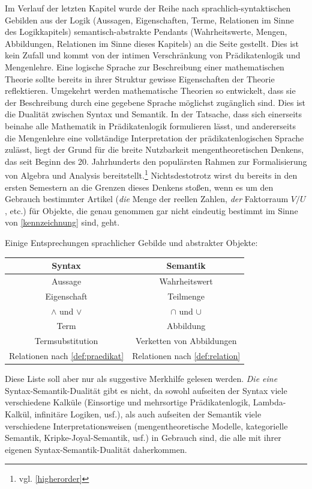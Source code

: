 \begin{bem} \label{syntaxvssemantik} 
    Im Verlauf der letzten Kapitel wurde der Reihe nach sprachlich-syntaktischen Gebilden aus der Logik (Aussagen, Eigenschaften, Terme, Relationen im Sinne des Logikkapitels) semantisch-abstrakte Pendants (Wahrheitswerte, Mengen, Abbildungen, Relationen im Sinne dieses Kapitels) an die Seite gestellt. Dies ist kein Zufall und kommt von der intimen Verschränkung von Prädikatenlogik und Mengenlehre. Eine logische Sprache zur Beschreibung einer mathematischen Theorie sollte bereits in ihrer Struktur gewisse Eigenschaften der Theorie reflektieren. Umgekehrt werden mathematische Theorien so entwickelt, dass sie der Beschreibung durch eine gegebene Sprache möglichst zugänglich sind. Dies ist die Dualität zwischen Syntax und Semantik. In der Tatsache, dass sich einerseits beinahe alle Mathematik in Prädikatenlogik formulieren lässt, und andererseits die Mengenlehre eine vollständige Interpretation der prädikatenlogischen Sprache zulässt, liegt der Grund für die breite Nutzbarkeit mengentheoretischen Denkens, das seit Beginn des 20. Jahrhunderts den populärsten Rahmen zur Formalisierung von Algebra und Analysis bereitstellt.\footnote{vgl. \cref{higherorder}} Nichtsdestotrotz wirst du bereits in den ersten Semestern an die Grenzen dieses Denkens stoßen, wenn es um den Gebrauch bestimmter Artikel (\emph{die} Menge der reellen Zahlen, \emph{der} Faktorraum $V/U$, etc.) für Objekte, die genau genommen gar nicht eindeutig bestimmt im Sinne von \cref{kennzeichnung} sind, geht.

    Einige Entsprechungen sprachlicher Gebilde und abstrakter Objekte:
    \begin{center}
    \begin{tabular}{cc}
        Syntax & Semantik \\
        \midrule
        Aussage & Wahrheitswert \\
        Eigenschaft & Teilmenge \\
        $\land$ und $\lor$ & $\cap$ und $\cup$ \\
        Term & Abbildung \\
        Termsubstitution & Verketten von Abbildungen \\
        Relationen nach \cref{def:praedikat} & Relationen nach \cref{def:relation} \\
    \end{tabular}
    \end{center}
    Diese Liste soll aber nur als suggestive Merkhilfe gelesen werden. \emph{Die eine} Syntax-Semantik-Dualität gibt es nicht, da sowohl aufseiten der Syntax viele verschiedene Kalküle (Einsortige und mehrsortige Prädikatenlogik, Lambda-Kalkül, infinitäre Logiken, usf.), als auch aufseiten der Semantik viele verschiedene Interpretationsweisen (mengentheoretische Modelle, kategorielle Semantik, Kripke-Joyal-Semantik, usf.) in Gebrauch sind, die alle mit ihrer eigenen Syntax-Semantik-Dualität daherkommen.
\end{bem}


